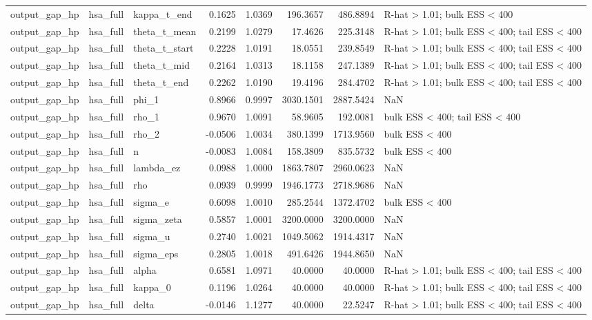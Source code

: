 \begin{tabular}{lllrrrrl}
output\_gap\_hp & hsa\_full & kappa\_t\_end & 0.1625 & 1.0369 & 196.3657 & 486.8894 & R-hat > 1.01; bulk ESS < 400 \\
output\_gap\_hp & hsa\_full & theta\_t\_mean & 0.2199 & 1.0279 & 17.4626 & 225.3148 & R-hat > 1.01; bulk ESS < 400; tail ESS < 400 \\
output\_gap\_hp & hsa\_full & theta\_t\_start & 0.2228 & 1.0191 & 18.0551 & 239.8549 & R-hat > 1.01; bulk ESS < 400; tail ESS < 400 \\
output\_gap\_hp & hsa\_full & theta\_t\_mid & 0.2164 & 1.0313 & 18.1158 & 247.1389 & R-hat > 1.01; bulk ESS < 400; tail ESS < 400 \\
output\_gap\_hp & hsa\_full & theta\_t\_end & 0.2262 & 1.0190 & 19.4196 & 284.4702 & R-hat > 1.01; bulk ESS < 400; tail ESS < 400 \\
output\_gap\_hp & hsa\_full & phi\_1 & 0.8966 & 0.9997 & 3030.1501 & 2887.5424 & NaN \\
output\_gap\_hp & hsa\_full & rho\_1 & 0.9670 & 1.0091 & 58.9605 & 192.0081 & bulk ESS < 400; tail ESS < 400 \\
output\_gap\_hp & hsa\_full & rho\_2 & -0.0506 & 1.0034 & 380.1399 & 1713.9560 & bulk ESS < 400 \\
output\_gap\_hp & hsa\_full & n & -0.0083 & 1.0084 & 158.3809 & 835.5732 & bulk ESS < 400 \\
output\_gap\_hp & hsa\_full & lambda\_ez & 0.0988 & 1.0000 & 1863.7807 & 2960.0623 & NaN \\
output\_gap\_hp & hsa\_full & rho & 0.0939 & 0.9999 & 1946.1773 & 2718.9686 & NaN \\
output\_gap\_hp & hsa\_full & sigma\_e & 0.6098 & 1.0010 & 285.2544 & 1372.4702 & bulk ESS < 400 \\
output\_gap\_hp & hsa\_full & sigma\_zeta & 0.5857 & 1.0001 & 3200.0000 & 3200.0000 & NaN \\
output\_gap\_hp & hsa\_full & sigma\_u & 0.2740 & 1.0021 & 1049.5062 & 1914.4317 & NaN \\
output\_gap\_hp & hsa\_full & sigma\_eps & 0.2805 & 1.0018 & 491.6426 & 1944.8650 & NaN \\
output\_gap\_hp & hsa\_full & alpha & 0.6581 & 1.0971 & 40.0000 & 40.0000 & R-hat > 1.01; bulk ESS < 400; tail ESS < 400 \\
output\_gap\_hp & hsa\_full & kappa\_0 & 0.1196 & 1.0264 & 40.0000 & 40.0000 & R-hat > 1.01; bulk ESS < 400; tail ESS < 400 \\
output\_gap\_hp & hsa\_full & delta & -0.0146 & 1.1277 & 40.0000 & 22.5247 & R-hat > 1.01; bulk ESS < 400; tail ESS < 400 \\

\end{tabular}
